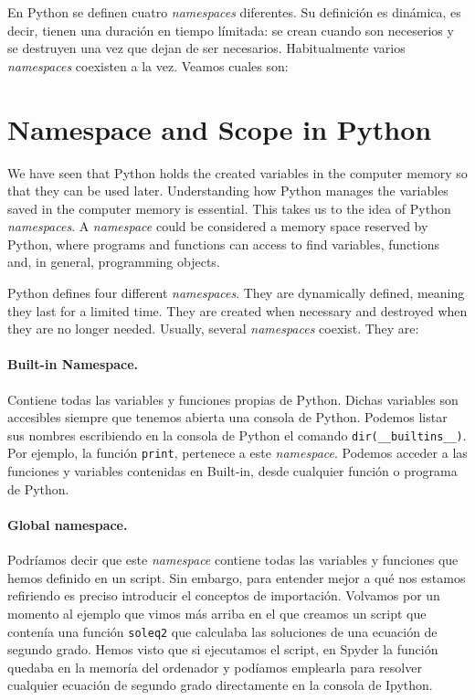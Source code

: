 \begin{paracol}{2}
En Python se definen cuatro \emph{namespaces} diferentes. Su definición es dinámica, es decir, tienen una duración en tiempo límitada: se crean cuando son neceserios y se destruyen una vez que dejan de ser necesarios. Habitualmente varios \emph{namespaces} coexisten a la vez. Veamos cuales son:

\switchcolumn
\section[Namespace and scope in Python]{Namespace and Scope in Python}
We have seen that Python holds the created variables in the computer memory so that they can be used later. Understanding how Python manages the variables saved in the computer memory is essential. This takes us to the idea of Python \emph{namespaces}.
A \emph{namespace} could be considered a memory space reserved by Python, where programs and functions can access to find variables, functions and, in general, programming objects.

Python defines four different \emph{namespaces}. They are dynamically defined, meaning they last for a limited time. They are created when necessary and destroyed when they are no longer needed. Usually, several \emph{namespaces} coexist. They are:

\switchcolumn
\paragraph{Built-in Namespace.} Contiene todas las variables y funciones propias de Python. Dichas variables son accesibles siempre que tenemos abierta una consola de Python. Podemos listar sus nombres escribiendo en la consola de Python el comando \texttt{dir(__builtins__)}. Por ejemplo, la función \texttt{print}, pertenece a este \emph{namespace}. Podemos acceder a las funciones y variables contenidas en Built-in, desde cualquier función o programa de Python.

\paragraph{Global namespace.} Podríamos decir que este \emph{namespace} contiene todas las variables y funciones que hemos definido en un script. Sin embargo, para entender mejor a qué nos estamos refiriendo es preciso introducir el conceptos de importación. Volvamos por un momento al ejemplo que vimos más arriba en el que creamos un script que contenía una función \texttt{soleq2} que calculaba las soluciones de una ecuación de segundo grado. Hemos visto que si ejecutamos el script, en Spyder la función quedaba en la memoría del ordenador y podíamos emplearla para resolver cualquier ecuación de segundo grado directamente en la consola de Ipython.


\end{paracol}
